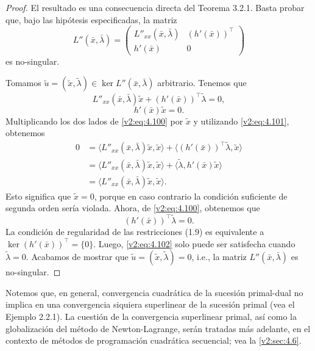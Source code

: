 \begin{proof}
    El resultado es una consecuencia directa del Teorema 3.2.1. Basta probar que, bajo las hipótesis especificadas, la matriz
    \[
        L''(\bar{x}, \bar{\lambda}) = \begin{pmatrix} L''_{xx}(\bar{x}, \bar{\lambda}) & (h'(\bar{x}))^\top \\ h'(\bar{x}) & 0 \end{pmatrix}
    \]
    es no-singular.

    Tomamos $\tilde{u} = (\tilde{x}, \tilde{\lambda}) \in \ker L''(\bar{x}, \bar{\lambda})$ arbitrario. Tenemos que
    \begin{equation}
        L''_{xx}(\bar{x}, \bar{\lambda})\tilde{x} + (h'(\bar{x}))^\top \tilde{\lambda} = 0,
        \label{v2:eq:4.100}
    \end{equation}
    \begin{equation}
        h'(\bar{x})\tilde{x} = 0.
        \label{v2:eq:4.101}
    \end{equation}
    Multiplicando los dos lados de \eqref{v2:eq:4.100} por $\tilde{x}$ y utilizando \eqref{v2:eq:4.101}, obtenemos
    \begin{align*}
        0 &= \langle L''_{xx}(\bar{x}, \bar{\lambda})\tilde{x}, \tilde{x} \rangle + \langle (h'(\bar{x}))^\top \tilde{\lambda}, \tilde{x} \rangle \\
        &= \langle L''_{xx}(\bar{x}, \bar{\lambda})\tilde{x}, \tilde{x} \rangle + \langle \tilde{\lambda}, h'(\bar{x})\tilde{x} \rangle \\
        &= \langle L''_{xx}(\bar{x}, \bar{\lambda})\tilde{x}, \tilde{x} \rangle.
    \end{align*}
    Esto significa que $\tilde{x} = 0$, porque en caso contrario la condición suficiente de segunda orden sería violada. Ahora, de \eqref{v2:eq:4.100}, obtenemos que
    \begin{equation}
        (h'(\bar{x}))^\top \tilde{\lambda} = 0.
        \label{v2:eq:4.102}
    \end{equation}
    La condición de regularidad de las restricciones (1.9) es equivalente a $\ker (h'(\bar{x}))^\top = \{0\}$. Luego, \eqref{v2:eq:4.102} solo puede ser satisfecha cuando $\tilde{\lambda} = 0$. Acabamos de mostrar que $\tilde{u} = (\tilde{x}, \tilde{\lambda}) = 0$, i.e., la matriz $L''(\bar{x}, \bar{\lambda})$ es no-singular.
\end{proof}

Notemos que, en general, convergencia cuadrática de la sucesión primal-dual no implica en una convergencia siquiera superlinear de la sucesión primal (vea el Ejemplo 2.2.1). La cuestión de la convergencia superlinear primal, así como la globalización del método de Newton-Lagrange, serán tratadas más adelante, en el contexto de métodos de programación cuadrática secuencial; vea la \cref{v2:sec:4.6}.

